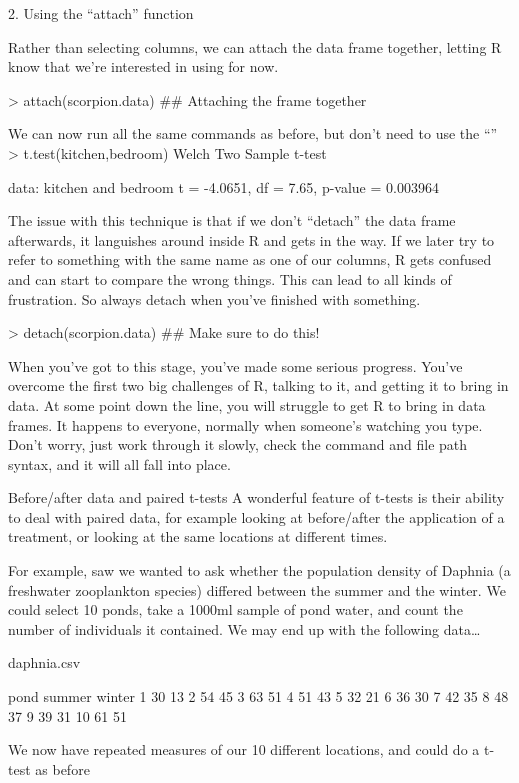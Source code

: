 \documentclass{article}
\begin{document}
    2. Using the “attach” function

Rather than selecting columns, we can attach the data frame together, letting R know that we’re interested in using for now. 

> attach(scorpion.data)  \#\# Attaching the frame together

We can now run all the same commands as before, but don’t need to use the “$”
$
> t.test(kitchen,bedroom) 
	Welch Two Sample t-test

data:  kitchen and bedroom 
t = -4.0651, df = 7.65, p-value = 0.003964

The issue with this technique is that if we don’t “detach” the data frame afterwards, it languishes around inside R and gets in the way. If we later try to refer to something with the same name as one of our columns, R gets confused and can start to compare the wrong things. This can lead to all kinds of frustration. So always detach when you’ve finished with something.

> detach(scorpion.data) \#\# Make sure to do this!

When you’ve got to this stage, you’ve made some serious progress. You’ve overcome the first two big challenges of R, talking to it, and getting it to bring in data. At some point down the line, you will struggle to get R to bring in data frames. It happens to everyone, normally when someone’s watching you type. Don’t worry, just work through it slowly, check the command and file path syntax, and it will all fall into place. 

Before/after data and paired t-tests
A wonderful feature of t-tests is their ability to deal with paired data, for example looking at before/after the application of a treatment, or looking at the same locations at different times. 

For example, saw we wanted to ask whether the population density of Daphnia (a freshwater zooplankton species) differed between the summer and the winter. We could select 10 ponds, take a 1000ml sample of pond water, and count the number of individuals it contained. We may end up with the following data…

	daphnia.csv

pond summer winter
      1     30     13
      2     54     45
      3     63     51
      4     51     43
      5     32     21
      6     36     30
      7     42     35
      8     48     37
      9     39     31
     10     61     51

We now have repeated measures of our 10 different locations, and could do a t-test as before
\end{document}
